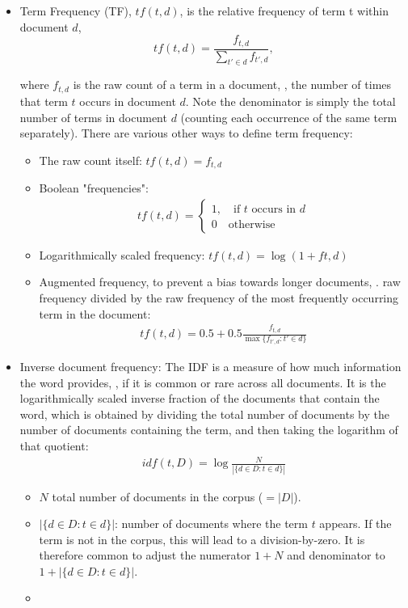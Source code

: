 \begin{itemize}
	\item Term Frequency (TF), $tf(t,d)$, is the relative frequency of term t within document $d$,
		$$tf(t,d) = \frac{f_{t,d}}{\sum_{t'\in d}f_{t',d}},$$

		where $f_{t,d}$ is the raw count of a term in a document, \ie, the number of times that term $t$ occurs in document $d$. Note the denominator is simply the total number of terms in document $d$ (counting each occurrence of the same term separately). There are various other ways to define term frequency:
		\begin{itemize}
			\item The raw count itself: $tf(t,d) = f_{t,d}$ 
    		\item Boolean "frequencies": 
				\begin{align*}
					tf(t,d) = \begin{cases}
						1, \quad \text{if $t$ occurs in $d$}\\
						0 \quad \text{otherwise}
							\end{cases}
				\end{align*}
    		\item Logarithmically scaled frequency: $tf(t,d) = \log (1 + ft,d)$
    		\item Augmented frequency, to prevent a bias towards longer documents, \eg. raw frequency divided by the raw frequency of the most frequently occurring term in the document:
				\begin{align*}
					tf(t,d) = 0.5 + 0.5\frac{f_{t,d}}{\max \{f_{t',d}:t' \in d\}}
				\end{align*}
		\end{itemize}
	\item Inverse document frequency: The IDF is a measure of how much information the word provides, \ie, if it is common or rare across all documents. It is the logarithmically scaled inverse fraction of the documents that contain the word, which is obtained by dividing the total number of documents by the number of documents containing the term, and then taking the logarithm of that quotient: 
		\begin{align*}
			idf(t, D) = \log \frac{N}{|\{d\in D: t\in d\}|}
		\end{align*}
		\begin{itemize}
			\item $N$ total number of documents in the corpus ($=|D|$). 
			\item $|\{d\in D: t\in d\}|$: number of documents where the term $t$ appears. If the term is not in the corpus, this will lead to a division-by-zero. It is therefore common to adjust the numerator $1 + N$ and denominator to $1+|\{d\in D: t\in d\}|$.
			\item 
		\end{itemize}

\end{itemize}

